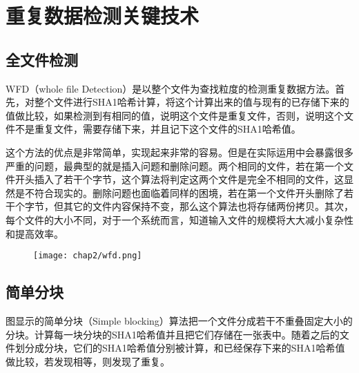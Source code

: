 
\chapter{重复数据检测关键技术}
\label{chap:tech}

\section{全文件检测}
\label{sec:WFD}

WFD（whole file Detection）是以整个文件为查找粒度的检测重复数据方法。首先，对整个文件进行SHA1哈希计算，将这个计算出来的值与现有的已存储下来的值做比较，如果检测到有相同的值，说明这个文件是重复文件，否则，说明这个文件不是重复文件，需要存储下来，并且记下这个文件的SHA1哈希值。

这个方法的优点是非常简单，实现起来非常的容易。但是在实际运用中会暴露很多严重的问题，最典型的就是插入问题和删除问题。两个相同的文件，若在第一个文件开头插入了若干个字节，这个算法将判定这两个文件是完全不相同的文件，这显然是不符合现实的。删除问题也面临着同样的困境，若在第一个文件开头删除了若干个字节，但其它的文件内容保持不变，那么这个算法也将存储两份拷贝。其次，每个文件的大小不同，对于一个系统而言，知道输入文件的规模将大大减小复杂性和提高效率。

\begin{figure}[!hbp]
    \begin{minipage}[b]{1\textwidth}
    \captionstyle{\centering}
    \centering
    \texttt{[image: chap2/wfd.png]}
    \end{minipage}     
\end{figure}

\section{简单分块}
\label{sec:simpleblock}

图显示的简单分块（Simple blocking）算法把一个文件分成若干不重叠固定大小的分块。计算每一块分块的SHA1哈希值并且把它们存储在一张表中。随着之后的文件划分成分块，它们的SHA1哈希值分别被计算，和已经保存下来的SHA1哈希值做比较，若发现相等，则发现了重复。

